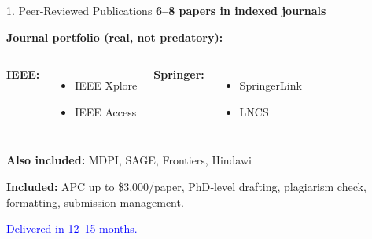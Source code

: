 \documentclass[aspectratio=169, 10pt]{beamer}
\begin{document}
	\begin{frame}{1. Peer‑Reviewed Publications}
		\faBookOpen \hspace{0.2cm} \textbf{6–8 papers in indexed journals}
		
		\textbf{Journal portfolio (real, not predatory):}
		\begin{columns}[T]
			\small
			\textbf{IEEE:}
			\begin{itemize}
				\item IEEE Xplore
				\item IEEE Access
			\end{itemize}
			\small
			\textbf{Springer:}
			\begin{itemize}
				\item SpringerLink
				\item LNCS
			\end{itemize}
		\end{columns}
		
		\vspace{0.3cm}
		\textbf{Also included:} MDPI, SAGE, Frontiers, Hindawi
		
		\vspace{0.2cm}
		\textbf{Included:} APC up to \$3,000/paper, PhD‑level drafting, plagiarism check, formatting, submission management.
		
		\vspace{0.2cm}
		\textcolor{blue}{Delivered in 12–15 months.}
	\end{frame}
	
\end{document}
